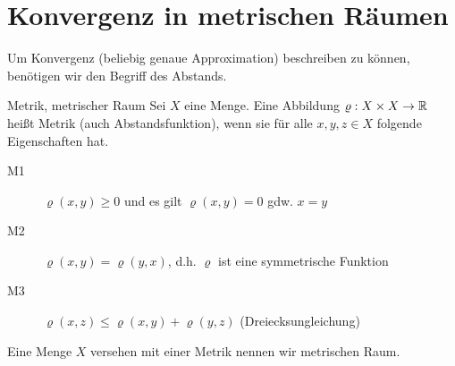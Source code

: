 \chapter{Konvergenz in metrischen Räumen}
Um Konvergenz (beliebig genaue Approximation) beschreiben zu können, benötigen wir den Begriff des Abstands.
\begin{definition}{Metrik, metrischer Raum}
	Sei $X$ eine Menge. Eine Abbildung $\varrho:X\times X\rightarrow \mathbb{R}$ heißt Metrik (auch Abstandsfunktion), wenn sie für alle $x,y,z\in X$ folgende Eigenschaften hat.
	\begin{description}
		\item[M1] $\varrho(x,y)\geq 0$ und es gilt $\varrho(x,y)=0$ gdw. $x=y$
		\item[M2] $\varrho(x,y)=\varrho(y,x)$, d.h. $\varrho$ ist eine symmetrische Funktion
		\item[M3] $\varrho(x,z)\leq\varrho(x,y)+\varrho(y,z)$ (Dreiecksungleichung)
	\end{description}
	Eine Menge $X$ versehen mit einer Metrik nennen wir metrischen Raum.
\end{definition}


